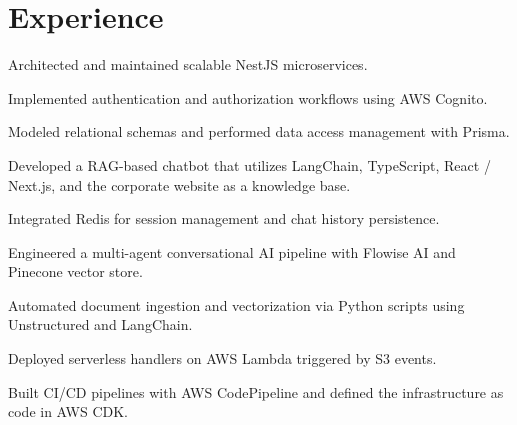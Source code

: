 \documentclass[letterpaper]{deedy-resume} %
\begin{document}
\begin{minipage}[t]{0.66\textwidth} %


\section{Experience}


\vspace{\topsep} %
\begin{tightitemize}
  \item Architected and maintained scalable NestJS microservices.
  \item Implemented authentication and authorization workflows using AWS Cognito.
  \item Modeled relational schemas and performed data access management with Prisma.
  \item Developed a RAG-based chatbot that utilizes LangChain, TypeScript, React / Next.js, and the corporate website as a knowledge base.
  \item Integrated Redis for session management and chat history persistence.
  \item Engineered a multi-agent conversational AI pipeline with Flowise AI and Pinecone vector store.
  \item Automated document ingestion and vectorization via Python scripts using Unstructured and LangChain.
  \item Deployed serverless handlers on AWS Lambda triggered by S3 events.
  \item Built CI/CD pipelines with AWS CodePipeline and defined the infrastructure as code in AWS CDK.
\end{tightitemize}

\sectionspace %




\end{minipage}
\end{document}

